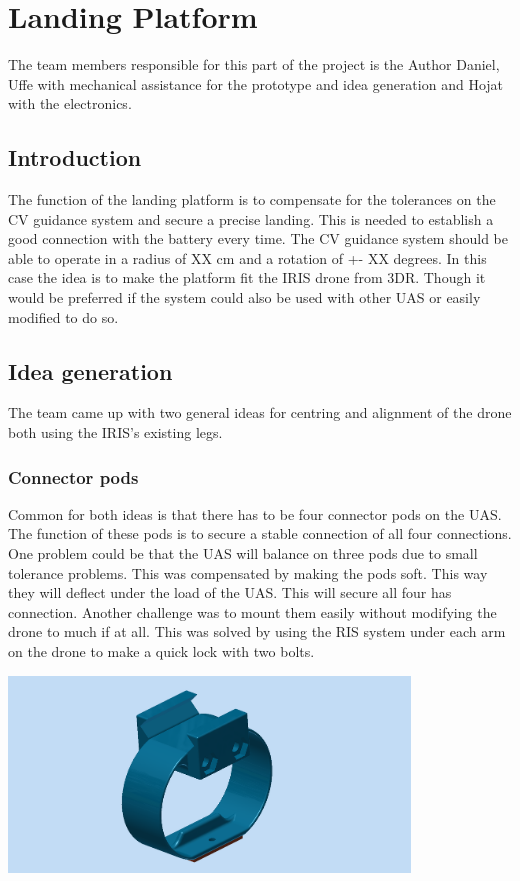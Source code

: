 \section{Landing Platform}
The team members responsible for this part of the project is the Author Daniel, Uffe with mechanical assistance for the prototype and idea generation and Hojat with the electronics.
\subsection{Introduction}
The function of the landing platform is to compensate for the tolerances on the CV guidance system and secure a precise landing. This is needed to establish a good connection with the battery every time. The CV guidance system should be able to operate in a radius of XX cm and a rotation of +- XX degrees.
In this case the idea is to make the platform fit the IRIS drone from 3DR. Though it would be preferred if the system could also be used with other UAS or easily modified to do so.
\subsection{Idea generation}
The team came up with two general ideas for centring and alignment of the drone both using the IRIS's existing legs.
\subsubsection{Connector pods}
Common for both ideas is that there has to be four connector pods on the UAS. The function of these pods is to secure a stable connection of all four connections. One problem could be that the UAS will balance on three pods due to small tolerance problems. This was compensated by making the pods soft. This way they will deflect under the load of the UAS. This will secure all four has connection.
Another challenge  was to mount them easily without modifying the drone to much if at all. This was solved by using the RIS system under each arm on the drone to make a quick lock with two bolts.
\begin{center}
	\includegraphics[width=0.8\textwidth]{imgs/connectorpod}
\end{center}
